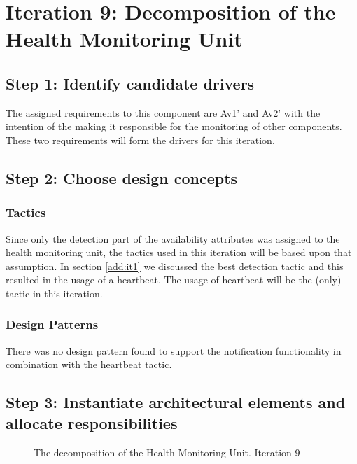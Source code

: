 \section{Iteration 9: Decomposition of the Health Monitoring Unit}
\label{add:it9}

\subsection{Step 1: Identify candidate drivers}
\label{add:it9/drivers}

\npar The assigned requirements to this component are Av1' and Av2' with the
intention of the making it responsible for the monitoring of other components.
These two requirements will form the drivers for this iteration.

\subsection{Step 2: Choose design concepts}
\label{add:it9/concepts}

\subsubsection{Tactics}
\label{add:it9/tactics}

\npar Since only the detection part of the availability attributes was assigned
to the health monitoring unit, the tactics used in this iteration will be based
upon that assumption. In section \ref{add:it1} we discussed the best detection
tactic and this resulted in the usage of a heartbeat. The usage of heartbeat
will be the (only) tactic in this iteration.

\subsubsection{Design Patterns}
\label{add:it9/patterns}

\npar There was no design pattern found to support the notification
functionality in combination with the heartbeat tactic.

\subsection{Step 3: Instantiate architectural elements and allocate responsibilities}
\label{add:it9/elements}

\begin{figure}[H]
	\begin{centering}
		\caption{The decomposition of the Health Monitoring Unit. Iteration
		9}
		\label{fig:add/it9/decomposition}
	\end{centering}
\end{figure}

